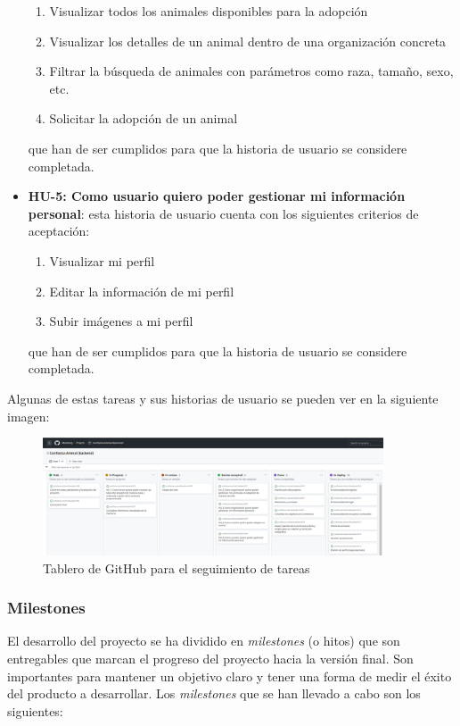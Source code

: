 \begin{itemize}
\begin{enumerate}
            \item Visualizar todos los animales disponibles para la adopción
            \item Visualizar los detalles de un animal dentro de una organización concreta
            \item Filtrar la búsqueda de animales con parámetros como raza, tamaño, sexo, etc.
            \item Solicitar la adopción de un animal
        \end{enumerate}
    que han de ser cumplidos para que la historia de usuario se considere completada.
    \item \textbf{HU-5: Como usuario quiero poder gestionar mi información personal}: esta historia de usuario cuenta
    con los siguientes criterios de aceptación:
        \begin{enumerate}
            \item Visualizar mi perfil
            \item Editar la información de mi perfil
            \item Subir imágenes a mi perfil
        \end{enumerate}
    que han de ser cumplidos para que la historia de usuario se considere completada.
\end{itemize}

Algunas de estas tareas y sus historias de usuario se pueden ver en la siguiente imagen:

\begin{figure}[H]
    \centering
    \includegraphics[width=0.9\textwidth]{imgs/tablero-github.png}
    \caption{Tablero de GitHub para el seguimiento de tareas}
    \label{fig:tablero-github}
\end{figure}

\subsubsection{Milestones}

El desarrollo del proyecto se ha dividido en \textit{milestones} (o hitos) que son entregables que marcan
el progreso del proyecto hacia la versión final. Son importantes para mantener un objetivo claro y tener una
forma de medir el éxito del producto a desarrollar. Los \textit{milestones} que se han llevado a cabo son los
siguientes:

